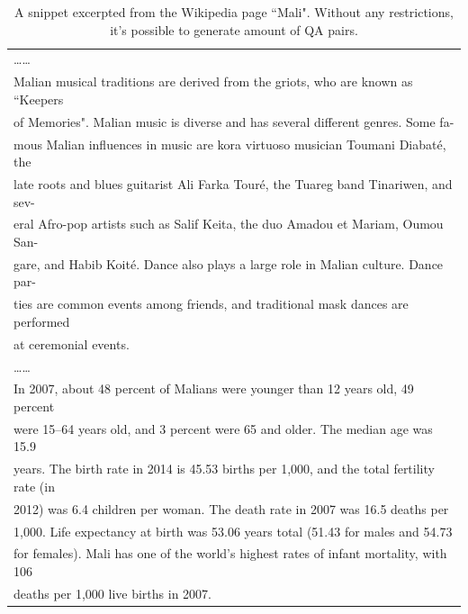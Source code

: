 \begin{table}[th]
\begin{tabular}{|l|}
……\\
Malian musical traditions are derived from the griots, who are known as ``Keepers\\ of Memories". Malian music is diverse and has several different genres. Some fa-\\mous Malian influences in music are kora virtuoso musician Toumani Diabaté, the\\ late roots and blues guitarist Ali Farka Touré, the Tuareg band Tinariwen, and sev-\\eral Afro-pop artists such as Salif Keita, the duo Amadou et Mariam, Oumou San-\\gare, and Habib Koité. Dance also plays a large role in Malian culture. Dance par-\\ties are common events among friends, and traditional mask dances are performed\\ at ceremonial events.\\
……\\
\raggedright
In 2007, about 48 percent of Malians were younger than 12 years old, 49 percent\\ were 15–64 years old, and 3 percent were 65 and older. The median age was 15.9\\ 
\raggedright
years. The birth rate in 2014 is 45.53 births per 1,000, and the total fertility rate (in\\ 2012) was 6.4 children per woman. The death rate in 2007 was 16.5 deaths per \\1,000. Life expectancy at birth was 53.06 years total (51.43 for males and 54.73\\ for females). Mali has one of the world's highest rates of infant mortality, with 106\\ deaths per 1,000 live births in 2007.\\
\hline
\end{tabular}
\caption{\label{tab:example} A snippet excerpted from the Wikipedia page ``Mali". Without any restrictions, it's possible to generate amount of QA pairs. }
\end{table}



